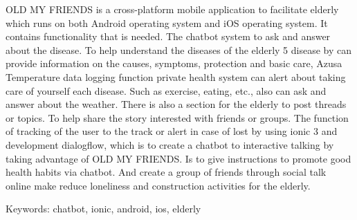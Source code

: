 \begin{englishabstract}
    OLD MY FRIENDS is a cross-platform mobile application to facilitate elderly which runs 
    on both Android operating system and iOS operating system. It contains functionality 
    that is needed. The chatbot system to ask and answer about the disease. To help understand 
    the diseases of the elderly 5 disease by can provide information on the causes, symptoms, 
    protection and basic care, Azusa Temperature data logging function private health system 
    can alert about taking care of yourself each disease. Such as exercise, eating, etc., 
    also can ask and answer about the weather. There is also a section for the elderly to post 
    threads or topics. To help share the story interested with friends or groups. The function of 
    tracking of the user to the track or alert in case of lost by using ionic 3 and development 
    dialogflow, which is to create a chatbot to interactive talking by taking advantage of OLD MY FRIENDS. 
    Is to give instructions to promote good health habits via chatbot. And create a group of friends 
    through social talk online make reduce loneliness and construction activities for the elderly.


\noindent
Keywords: chatbot, ionic, android, ios, elderly 
\end{englishabstract}

